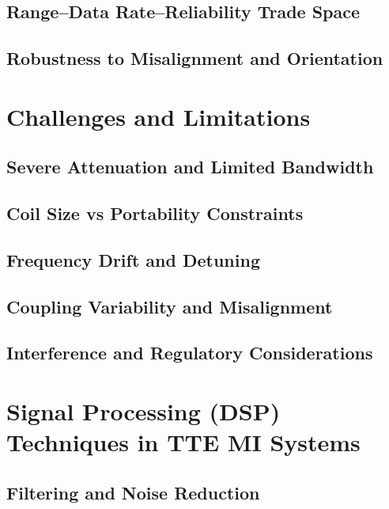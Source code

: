 \subsection{Range--Data Rate--Reliability Trade Space}\label{subsec:trade-space}

\subsection{Robustness to Misalignment and Orientation}\label{subsec:robustness-misalignment}

\section{Challenges and Limitations}\label{sec:challenges-limitations}
\subsection{Severe Attenuation and Limited Bandwidth}\label{subsec:attenuation-bandwidth}
\subsection{Coil Size vs Portability Constraints}\label{subsec:coil-size}
\subsection{Frequency Drift and Detuning}\label{subsec:frequency-drift}
\subsection{Coupling Variability and Misalignment}\label{subsec:coupling-variability}
\subsection{Interference and Regulatory Considerations}\label{subsec:interference}

\section{Signal Processing (DSP) Techniques in TTE MI Systems}\label{sec:dsp-tte}
\subsection{Filtering and Noise Reduction}\label{subsec:filtering-noise}

